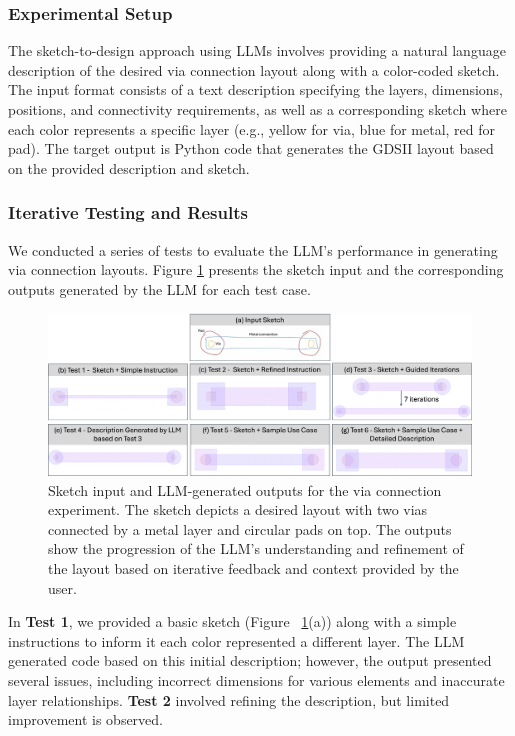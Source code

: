 \documentclass{article}
\begin{document}
\subsubsection{Experimental Setup}
The sketch-to-design approach using LLMs involves providing a natural language description of the desired via connection layout along with a color-coded sketch. The input format consists of a text description specifying the layers, dimensions, positions, and connectivity requirements, as well as a corresponding sketch where each color represents a specific layer (e.g., yellow for via, blue for metal, red for pad). The target output is Python code that generates the GDSII layout based on the provided description and sketch.
\subsubsection{Iterative Testing and Results}
We conducted a series of tests to evaluate the LLM's performance in generating via connection layouts. Figure \ref{fig:via_experiment} presents the sketch input and the corresponding outputs generated by the LLM for each test case.
\begin{figure}[!h]
\centering
\includegraphics[width=1\linewidth]{Styles/Figure1_v3.png}
\caption{Sketch input and LLM-generated outputs for the via connection experiment. The sketch depicts a desired layout with two vias connected by a metal layer and circular pads on top. The outputs show the progression of the LLM's understanding and refinement of the layout based on iterative feedback and context provided by the user.}
\label{fig:via_experiment}
\end{figure}
In \textbf{Test 1}, we provided a basic sketch (Figure ~\ref{fig:via_experiment}(a)) along with a simple instructions to inform it each color represented a different layer. The LLM generated code based on this initial description; however, the output presented several issues, including incorrect dimensions for various elements and inaccurate layer relationships. \textbf{Test 2} involved refining the description, but limited improvement is observed. 
\end{document}
